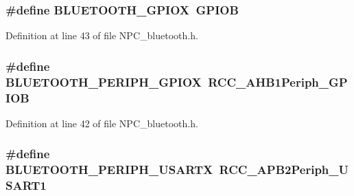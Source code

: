 \subsubsection[{\texorpdfstring{B\+L\+U\+E\+T\+O\+O\+T\+H\+\_\+\+G\+P\+I\+OX}{BLUETOOTH_GPIOX}}]{\setlength{\rightskip}{0pt plus 5cm}\#define B\+L\+U\+E\+T\+O\+O\+T\+H\+\_\+\+G\+P\+I\+OX~G\+P\+I\+OB}\hypertarget{group__bluetooth___constants_gad47fcf58a7d55e48e039420b36350fcd}{}\label{group__bluetooth___constants_gad47fcf58a7d55e48e039420b36350fcd}


Definition at line 43 of file N\+P\+C\+\_\+bluetooth.\+h.

\subsubsection[{\texorpdfstring{B\+L\+U\+E\+T\+O\+O\+T\+H\+\_\+\+P\+E\+R\+I\+P\+H\+\_\+\+G\+P\+I\+OX}{BLUETOOTH_PERIPH_GPIOX}}]{\setlength{\rightskip}{0pt plus 5cm}\#define B\+L\+U\+E\+T\+O\+O\+T\+H\+\_\+\+P\+E\+R\+I\+P\+H\+\_\+\+G\+P\+I\+OX~R\+C\+C\+\_\+\+A\+H\+B1\+Periph\+\_\+\+G\+P\+I\+OB}\hypertarget{group__bluetooth___constants_gab9bf1b33e271246e795a3847516e0949}{}\label{group__bluetooth___constants_gab9bf1b33e271246e795a3847516e0949}


Definition at line 42 of file N\+P\+C\+\_\+bluetooth.\+h.

\subsubsection[{\texorpdfstring{B\+L\+U\+E\+T\+O\+O\+T\+H\+\_\+\+P\+E\+R\+I\+P\+H\+\_\+\+U\+S\+A\+R\+TX}{BLUETOOTH_PERIPH_USARTX}}]{\setlength{\rightskip}{0pt plus 5cm}\#define B\+L\+U\+E\+T\+O\+O\+T\+H\+\_\+\+P\+E\+R\+I\+P\+H\+\_\+\+U\+S\+A\+R\+TX~R\+C\+C\+\_\+\+A\+P\+B2\+Periph\+\_\+\+U\+S\+A\+R\+T1}\hypertarget{group__bluetooth___constants_gac4b97204cfdd1ad5faebd0a56a6521c6}{}\label{group__bluetooth___constants_gac4b97204cfdd1ad5faebd0a56a6521c6}


